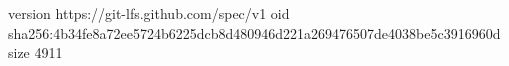 version https://git-lfs.github.com/spec/v1
oid sha256:4b34fe8a72ee5724b6225dcb8d480946d221a269476507de4038be5c3916960d
size 4911
